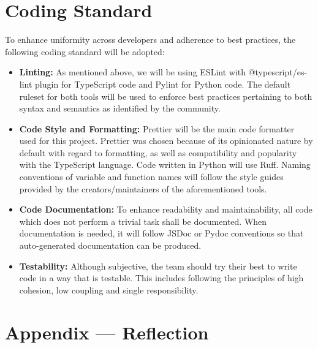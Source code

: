 \documentclass{article}
\begin{document}
\section{Coding Standard}

To enhance uniformity across developers and adherence to best
practices, the following coding standard will
be adopted:
\begin{itemize}
  \item \textbf{Linting:} As mentioned above, we will be using ESLint
    with @typescript/es-lint plugin for TypeScript
    code and Pylint for Python code. The default ruleset for both
    tools will be used to enforce best
    practices pertaining to both syntax and semantics as identified
    by the community.\\
  \item \textbf{Code Style and Formatting:} Prettier will be the main
    code formatter used for this project. Prettier was
    chosen because of its opinionated nature by default with regard
    to formatting, as well as compatibility
    and popularity with the TypeScript language. Code written in
    Python will use Ruff. Naming conventions
    of variable and function names will follow the style guides
    provided by the creators/maintainers of the
    aforementioned tools.\\
  \item \textbf{Code Documentation:} To enhance readability and
    maintainability, all code which does not perform a
    trivial task shall be documented. When documentation is needed,
    it will follow JSDoc or Pydoc
    conventions so that auto-generated documentation can be produced.\\
  \item \textbf{Testability:} Although subjective, the team should
    try their best to write code in a way that is testable.
    This includes following the principles of high cohesion, low
    coupling and single responsibility.\\
\end{itemize}

\newpage{}

\section*{Appendix --- Reflection}
\end{document}
